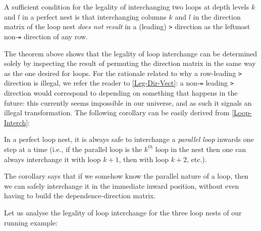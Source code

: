 \begin{theorem}\label{Loop-Interch}
  A sufficient condition for the legality of interchanging two loops
  at depth levels $k$ and $l$ in a perfect nest is that interchanging
  columns $k$ and $l$ in the direction matrix of the loop nest
  \emph{does not result} in a (leading) \texttt{>} direction as the
  leftmost non-\texttt{=} direction of any row.
\end{theorem}

The theorem above shows that the legality of loop interchange
can be determined solely by inspecting the result of permuting
the direction matrix in the same way as the one desired for loops.
For the rationale related to why a row-leading \texttt{>} direction
is illegal, we refer the reader to \cref{Leg-Dir-Vect}: a non-\texttt{=}
leading \texttt{>} direction would correspond to depending on something
that happens in the future: this currently seems impossible in our
universe, and as such it signals an illegal transformation.
%
The following corollary can be easily derived from \cref{Loop-Interch}:

\begin{corollary}\label{Par-Loop-Interch}
  In a perfect loop nest, it is always safe to interchange a
  {\em parallel loop} inwards one step at a time (i.e., if the
  parallel loop is the $k^{th}$ loop in the nest then one can
  always interchange it with loop $k+1$, then with loop $k+2$, etc.).
\end{corollary}

The corollary says that if we somehow know the parallel nature
of a loop, then we can safely interchange it in the immediate inward
position, without even having to build the dependence-direction matrix.

Let us analyse the legality of loop interchange for the three loop
nests of our running example:

